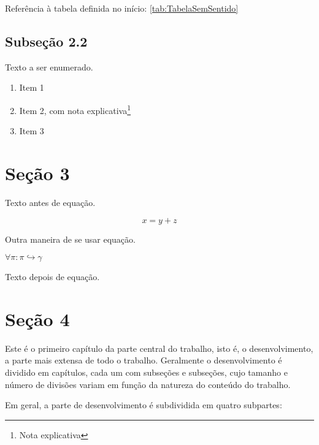 Referência à tabela definida no início: \ref{tab:TabelaSemSentido}


\subsection{Subseção 2.2}

Texto a ser enumerado.

\begin{enumerate}
   \item Item 1
   \item Item 2, com nota explicativa\footnote{Nota explicativa}
   \item Item 3
\end{enumerate}


\section{Seção 3}

Texto antes de equação.

\begin{equation}
   x = y + z
\end{equation}

Outra maneira de se usar equação.

$ \forall \pi : \pi \hookrightarrow \gamma $

Texto depois de equação.

\section{Seção 4}

Este é o primeiro capítulo da parte central do trabalho, isto é, o
desenvolvimento, a parte mais extensa de todo o trabalho. Geralmente o
desenvolvimento é dividido em capítulos, cada um com subseções e subseções,
cujo tamanho e número de divisões variam em função da natureza do conteúdo do
trabalho.

Em geral, a parte de desenvolvimento é subdividida em quatro subpartes:

